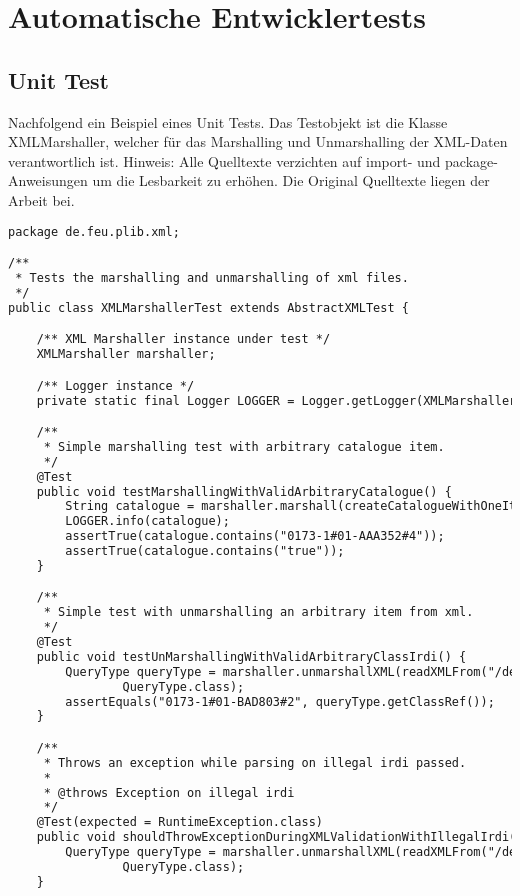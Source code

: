\chapter{Automatische Entwicklertests} \label{anh:automatischeentwicklertests}
 
\section{Unit Test}
Nachfolgend ein Beispiel eines Unit Tests. Das Testobjekt ist die Klasse XMLMarshaller, welcher für das \gls{Marshalling} und \gls{Unmarshalling} der XML-Daten verantwortlich ist. Hinweis: Alle Quelltexte verzichten auf import- und package-Anweisungen um die Lesbarkeit zu erhöhen. Die Original Quelltexte liegen der Arbeit bei. 
 
\begin{lstlisting}[caption=Beispiel eines Unit Tests, language=XML, label=lst:unittest_beispiel]
package de.feu.plib.xml;

/**
 * Tests the marshalling and unmarshalling of xml files.
 */
public class XMLMarshallerTest extends AbstractXMLTest {

    /** XML Marshaller instance under test */
    XMLMarshaller marshaller;

    /** Logger instance */
    private static final Logger LOGGER = Logger.getLogger(XMLMarshallerTest.class);

    /**
     * Simple marshalling test with arbitrary catalogue item.
     */
    @Test
    public void testMarshallingWithValidArbitraryCatalogue() {
        String catalogue = marshaller.marshall(createCatalogueWithOneItem());
        LOGGER.info(catalogue);
        assertTrue(catalogue.contains("0173-1#01-AAA352#4"));
        assertTrue(catalogue.contains("true"));
    }

    /**
     * Simple test with unmarshalling an arbitrary item from xml.
     */
    @Test
    public void testUnMarshallingWithValidArbitraryClassIrdi() {
        QueryType queryType = marshaller.unmarshallXML(readXMLFrom("/de/feu/plib/xml/query_class_irdi.xml"),
                QueryType.class);
        assertEquals("0173-1#01-BAD803#2", queryType.getClassRef());
    }

    /**
     * Throws an exception while parsing on illegal irdi passed.
     *
     * @throws Exception on illegal irdi
     */
    @Test(expected = RuntimeException.class)
    public void shouldThrowExceptionDuringXMLValidationWithIllegalIrdi() throws Exception {
        QueryType queryType = marshaller.unmarshallXML(readXMLFrom("/de/feu/plib/xml/query_class_irdi_illegal.xml"),
                QueryType.class);
    }


\end{lstlisting}
